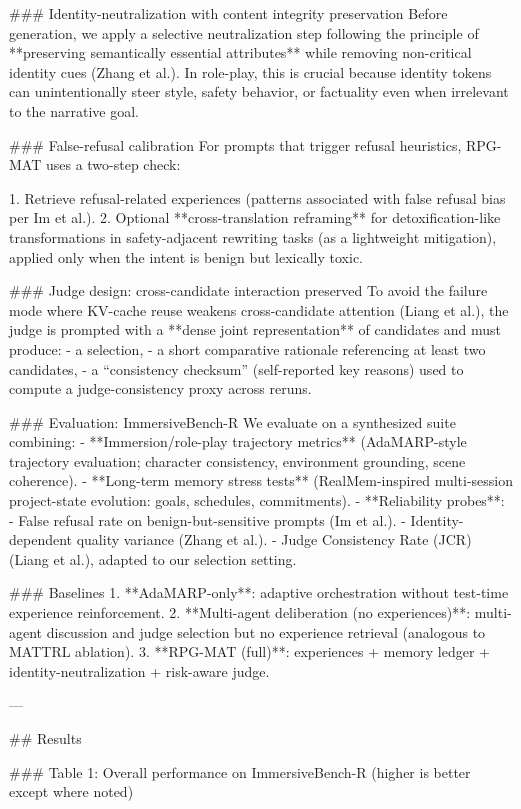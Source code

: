 ### Identity-neutralization with content integrity preservation  
Before generation, we apply a selective neutralization step following the principle of **preserving semantically essential attributes** while removing non-critical identity cues (Zhang et al.). In role-play, this is crucial because identity tokens can unintentionally steer style, safety behavior, or factuality even when irrelevant to the narrative goal.

### False-refusal calibration  
For prompts that trigger refusal heuristics, RPG-MAT uses a two-step check:

1. Retrieve refusal-related experiences (patterns associated with false refusal bias per Im et al.).  
2. Optional **cross-translation reframing** for detoxification-like transformations in safety-adjacent rewriting tasks (as a lightweight mitigation), applied only when the intent is benign but lexically toxic.

### Judge design: cross-candidate interaction preserved  
To avoid the failure mode where KV-cache reuse weakens cross-candidate attention (Liang et al.), the judge is prompted with a **dense joint representation** of candidates and must produce:
- a selection,
- a short comparative rationale referencing at least two candidates,
- a “consistency checksum” (self-reported key reasons) used to compute a judge-consistency proxy across reruns.

### Evaluation: ImmersiveBench-R  
We evaluate on a synthesized suite combining:
- **Immersion/role-play trajectory metrics** (AdaMARP-style trajectory evaluation; character consistency, environment grounding, scene coherence).  
- **Long-term memory stress tests** (RealMem-inspired multi-session project-state evolution: goals, schedules, commitments).  
- **Reliability probes**:
  - False refusal rate on benign-but-sensitive prompts (Im et al.).
  - Identity-dependent quality variance (Zhang et al.).
  - Judge Consistency Rate (JCR) (Liang et al.), adapted to our selection setting.

### Baselines  
1. **AdaMARP-only**: adaptive orchestration without test-time experience reinforcement.  
2. **Multi-agent deliberation (no experiences)**: multi-agent discussion and judge selection but no experience retrieval (analogous to MATTRL ablation).  
3. **RPG-MAT (full)**: experiences + memory ledger + identity-neutralization + risk-aware judge.

---

## Results  

### Table 1: Overall performance on ImmersiveBench-R (higher is better except where noted)  

